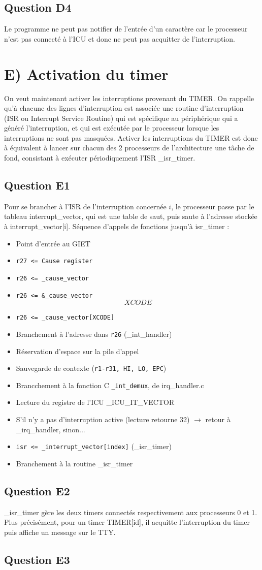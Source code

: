 \documentclass[10pt]{article}
\begin{document}
\subsection{Question D4}
Le programme ne peut pas notifier de l'entrée d'un caractère car le processeur
n'est pas connecté à l'ICU et donc ne peut pas acquitter de l'interruption.

\section{E) Activation du timer}
On veut maintenant activer les interruptions provenant du TIMER.
On rappelle qu'à chacune des lignes d’interruption est associée une routine
d’interruption (ISR ou Interrupt Service Routine) qui est spécifique au
périphérique qui a généré l’interruption, et qui est exécutée par le processeur
lorsque les interruptions ne sont pas masquées. Activer les interruptions du
TIMER est donc à équivalent à lancer sur chacun des 2 processeurs de
l'architecture une tâche de fond, consistant à exécuter périodiquement
l'ISR \_isr\_timer.

\subsection{Question E1}
Pour se brancher à l'ISR de l'interruption concernée $i$, le processeur passe
par le tableau interrupt\_vector, qui est une table de saut, puis saute à
l'adresse stockée à interrupt\_vector[i].
\newline
Séquence d'appels de fonctions jusqu'à isr\_timer :
\begin{itemize}
  \item Point d'entrée au GIET
  \item \texttt{r27 <= Cause register}
  \item \texttt{r26 <= \_cause\_vector}
  \item \texttt{r26 <= \&\_cause\_vector\[XCODE\]}
  \item \texttt{r26 <= \_cause\_vector[XCODE]}
  \item Branchement à l'adresse dans \texttt{r26} (\_int\_handler)
  \item Réservation d'espace sur la pile d'appel
  \item Sauvegarde de contexte (\texttt{r1-r31, HI, LO, EPC})
  \item Brancchement à la fonction C \texttt{\_int\_demux}, de irq\_handler.c
  \item Lecture du registre de l'ICU \_ICU\_IT\_VECTOR
  \item S'il n'y a pas d'interruption active (lecture retourne 32)
  $\rightarrow$ retour à \_irq\_handler, sinon...
  \item \texttt{isr <= \_interrupt\_vector[index]} (\_isr\_timer)
  \item Branchement à la routine \_isr\_timer
\end{itemize}

\subsection{Question E2}
\_isr\_timer gère les deux timers connectés respectivement aux processeurs 0 et
1. Plus précisément, pour un timer TIMER[id], il acquitte l'interruption du
timer puis affiche un message sur le TTY.

\subsection{Question E3}
\end{document}
